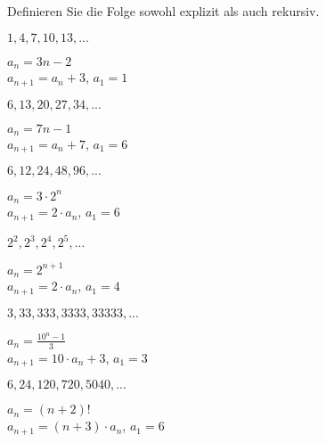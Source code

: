 \begin{exercisesK}
\endtwocol

Definieren Sie die Folge sowohl explizit als auch rekursiv.
\twocol
\begin{exercise} $1,4,7,10,13,...$\begin{answer}  $a_{n}=3n-2$ \\ $a_{n+1}=a_{n}+3$, $a_{1}=1$
\end{answer}
\end{exercise}
\begin{exercise} $6,13,20,27,34,...$\begin{answer}  $a_{n}=7n-1$ \\ $a_{n+1}=a_{n}+7$, $a_{1}=6$
\end{answer}
\end{exercise}
\begin{exercise} $6,12,24,48,96,...$\begin{answer}  $a_{n}=3 \cdot 2^{n}$ \\ $a_{n+1}=2 \cdot a_{n}$, $a_{1}=6$
\end{answer}
\end{exercise}
\begin{exercise} $2^2, 2^3, 2^4, 2^5,...$\begin{answer}  $a_{n}=2^{n+1}$ \\ $a_{n+1}=2 \cdot a_{n}$, $a_{1}=4$
\end{answer}
\end{exercise}
\begin{exercise} $3,33,333,3333,33333,...$\begin{answer}  $a_{n}=\frac{10^{n}-1}{3}$ \\ $a_{n+1}=10 \cdot a_{n}+3$, $a_{1}=3$
\end{answer}
\end{exercise}
\begin{exercise} $6,24,120,720,5040,...$\begin{answer}  $a_{n}=(n+2)!$ \\ $a_{n+1}=(n+3) \cdot a_{n}$, $a_{1}=6$ 
\end{answer}
\end{exercise}
\endtwocol


\end{exercisesK}
